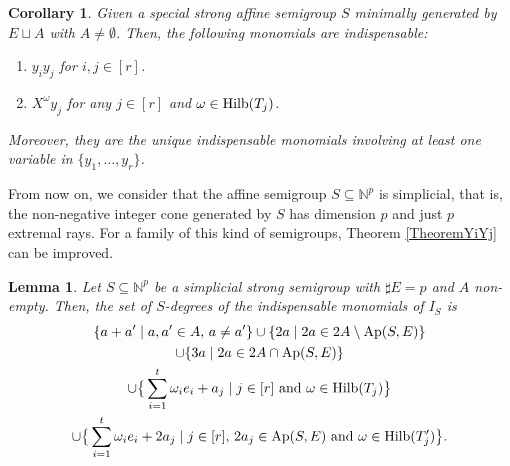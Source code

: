 \documentclass[a4paper,11pt]{article}
\newtheorem{corollary}[theorem]{Corollary}
\newtheorem{lemma}[theorem]{Lemma}
\def\N{\mathbb{N}}
\def\Ap{\operatorname{Ap}}
\begin{document}
{\begin{corollary}\label{CorollaryYiYj}
Given a special strong affine semigroup  $S$ minimally generated by $E\sqcup A$ with $A\neq \emptyset$. Then, the following monomials are indispensable:
\begin{enumerate}
\item $y_i y_j$ for $i,j\in [r]$.
\item  $X^\omega y_j$  for any $j\in [r]$ and $\omega \in {\rm Hilb} (T_j)$.
\end{enumerate}
Moreover, they are the unique indispensable monomials involving at least one variable in $\{y_1,\ldots, y_r\}$.
\end{corollary}

From now on, we consider that the affine semigroup $S\subseteq \N^p$ is simplicial, that is, the non-negative integer cone generated by $S$ has dimension $p$ and just $p$ extremal rays. For a family of this kind of semigroups, Theorem \ref{TheoremYiYj} can be improved.

\begin{lemma}\label{IndispSimplicial}
Let $S\subseteq \N^p$ be a simplicial strong semigroup with $\sharp E= p$ and $A$ non-empty. Then, the set of $S$-degrees of the indispensable monomials of $I_S$ is
\begin{multline*}
    \{a+a'\mid a,a'\in A,\, a\neq a'\}\cup \{2a\mid 2a\in 2A\setminus \Ap (S,E)\} \\\cup \{3a\mid 2a\in 2A\cap\Ap (S,E)\}\\ \cup \big\{\sum_{i=1}^t\omega_i e_i+a_j \mid j\in [r]\mbox{ and } \omega \in {\rm Hilb} (T_j)\big\}
    \\ \cup \big\{\sum_{i=1}^t\omega_i e_i+2a_j \mid j\in [r],\, 2a_j\in\Ap(S,E) \mbox{ and } \omega \in {\rm Hilb} (T'_j)\big\}.
\end{multline*}

\end{lemma}

}
\end{document}
